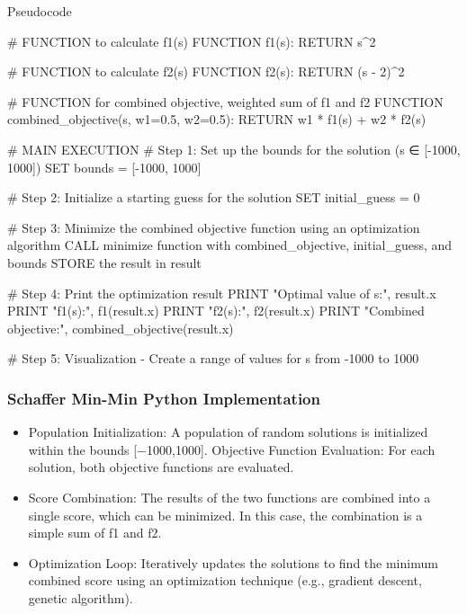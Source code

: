 \documentclass[
  letterpaper,
  DIV=11,
  numbers=noendperiod]{scrreprt}
\newenvironment{Shaded}{\begin{snugshade}}{\end{snugshade}}
\newcommand{\NormalTok}[1]{\textcolor[rgb]{0.00,0.23,0.31}{#1}}
\providecommand{\tightlist}{%
  \setlength{\itemsep}{0pt}\setlength{\parskip}{0pt}}\usepackage{longtable,booktabs,array}
\begin{document}
\begin{Shaded}
\begin{Highlighting}[]
\NormalTok{Pseudocode}

\NormalTok{\# FUNCTION to calculate f1(s)}
\NormalTok{FUNCTION f1(s):}
\NormalTok{    RETURN s\^{}2}

\NormalTok{\# FUNCTION to calculate f2(s)}
\NormalTok{FUNCTION f2(s):}
\NormalTok{    RETURN (s {-} 2)\^{}2}

\NormalTok{\# FUNCTION for combined objective, weighted sum of f1 and f2}
\NormalTok{FUNCTION combined\_objective(s, w1=0.5, w2=0.5):}
\NormalTok{    RETURN w1 * f1(s) + w2 * f2(s)}

\NormalTok{\# MAIN EXECUTION}
\NormalTok{\# Step 1: Set up the bounds for the solution (s ∈ [{-}1000, 1000])}
\NormalTok{SET bounds = [{-}1000, 1000]}

\NormalTok{\# Step 2: Initialize a starting guess for the solution}
\NormalTok{SET initial\_guess = 0}

\NormalTok{\# Step 3: Minimize the combined objective function using an optimization algorithm}
\NormalTok{CALL minimize function with combined\_objective, initial\_guess, and bounds}
\NormalTok{STORE the result in result}

\NormalTok{\# Step 4: Print the optimization result}
\NormalTok{PRINT "Optimal value of s:", result.x}
\NormalTok{PRINT "f1(s):", f1(result.x)}
\NormalTok{PRINT "f2(s):", f2(result.x)}
\NormalTok{PRINT "Combined objective:", combined\_objective(result.x)}

\NormalTok{\# Step 5: Visualization {-} Create a range of values for s from {-}1000 to 1000}
\end{Highlighting}
\end{Shaded}

\subsubsection{Schaffer Min-Min Python
Implementation}\label{schaffer-min-min-python-implementation}

\begin{itemize}
\tightlist
\item
  Population Initialization: A population of random solutions is
  initialized within the bounds {[}−1000,1000{]}. Objective Function
  Evaluation: For each solution, both objective functions are evaluated.
\item
  Score Combination: The results of the two functions are combined into
  a single score, which can be minimized. In this case, the combination
  is a simple sum of f1 and f2.
\item
  Optimization Loop: Iteratively updates the solutions to find the
  minimum combined score using an optimization technique (e.g., gradient
  descent, genetic algorithm).
\end{itemize}
\end{document}
